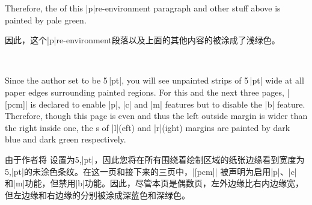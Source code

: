 Therefore, the \bground{} of this |p|re-environment paragraph and other
stuff above is painted by pale green.

因此，这个|p|re-environment段落以及上面的其他内容的\bground{}被涂成了浅绿色。



Since the author set \Uidx{\!\pagerim!} to be 5\,|pt|, you will see
unpainted strips of 5\,|pt| wide at all paper edges surrounding painted
regions.  For this and the next three pages, \Uidx{\!\twosided!}|[pcm]| is
declared to enable |p|, |c| and |m| features but to disable the |b|
feature.  Therefore, though this page \pageref{sec:bgpaint} is even and
thus the left outside margin is wider than the right inside one, the
\bground{}s of |l|(eft) and |r|(ight) margins are painted by dark blue and
dark green respectively.

由于作者将 \Uidx{\!\pagerim!} 设置为5,|pt|，因此您将在所有围绕着绘制区域的纸张边缘看到宽度为5,|pt|的未涂色条纹。在这一页和接下来的三页中，\Uidx{\!\twosided!}|[pcm]| 被声明为启用|p|、|c|和|m|功能，但禁用|b|功能。因此，尽管本页\pageref{sec:bgpaint}是偶数页，左外边缘比右内边缘宽，但左边缘和右边缘的\bground{}分别被涂成深蓝色和深绿色。

